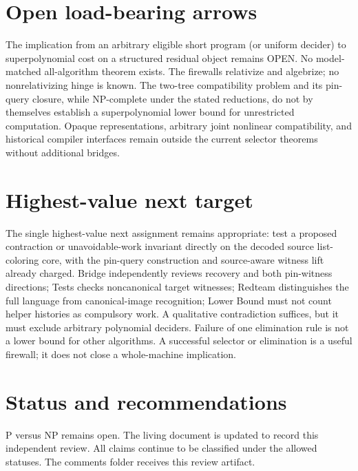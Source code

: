 \documentclass[11pt]{article}
\begin{document}
\section{Open load-bearing arrows}
The implication from an arbitrary eligible short program (or uniform decider) to superpolynomial cost on a structured residual object remains OPEN. No model-matched all-algorithm theorem exists. The firewalls relativize and algebrize; no nonrelativizing hinge is known. The two-tree compatibility problem and its pin-query closure, while NP-complete under the stated reductions, do not by themselves establish a superpolynomial lower bound for unrestricted computation. Opaque representations, arbitrary joint nonlinear compatibility, and historical compiler interfaces remain outside the current selector theorems without additional bridges.

\section{Highest-value next target}
The single highest-value next assignment remains appropriate: test a proposed contraction or unavoidable-work invariant directly on the decoded source list-coloring core, with the pin-query construction and source-aware witness lift already charged. Bridge independently reviews recovery and both pin-witness directions; Tests checks noncanonical target witnesses; Redteam distinguishes the full language from canonical-image recognition; Lower Bound must not count helper histories as compulsory work. A qualitative contradiction suffices, but it must exclude arbitrary polynomial deciders. Failure of one elimination rule is not a lower bound for other algorithms. A successful selector or elimination is a useful firewall; it does not close a whole-machine implication.

\section{Status and recommendations}
P versus NP remains open. The living document is updated to record this independent review. All claims continue to be classified under the allowed statuses. The comments folder receives this review artifact.

\end{document}
